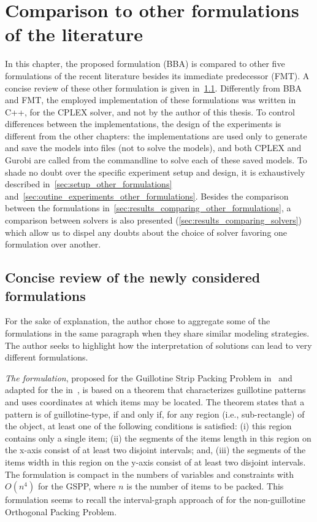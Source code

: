\chapter{Comparison to other formulations of the literature}
\label{sec:martin_chapter}

In this chapter, the proposed formulation (BBA) is compared to other five formulations of the recent literature besides its immediate predecessor (FMT).
A concise review of these other formulation is given in~\cref{sec:other_formulations}.
Differently from BBA and FMT, the employed implementation of these formulations was written in C++, for the CPLEX solver, and not by the author of this thesis.
To control differences between the implementations, the design of the experiments is different from the other chapters: the implementations are used only to generate and save the models into files (not to solve the models), and both CPLEX and Gurobi are called from the commandline to solve each of these saved models.
To shade no doubt over the specific experiment setup and design, it is exhaustively described in~\cref{sec:setup_other_formulations} and~\cref{sec:outine_experiments_other_formulations}.
Besides the comparison between the formulations in~\cref{sec:results_comparing_other_formulations}, a comparison between solvers is also presented (\cref{sec:results_comparing_solvers}) which allow us to dispel any doubts about the choice of solver favoring one formulation over another.

\section{Concise review of the newly considered formulations}
\label{sec:other_formulations}

For the sake of explanation, the author chose to aggregate some of the formulations in the same paragraph when they share similar modeling strategies.
The author seeks to highlight how the interpretation of solutions can lead to very different formulations.

\emph{The {\modelBCE} formulation}, proposed for the Guillotine Strip Packing Problem in~\citet{messaoud:2008} and adapted for the {\myproblem} in~\citet{martin:2020}, is based on a theorem that characterizes guillotine patterns and uses coordinates at which items may be located.
The theorem states that a pattern is of guillotine-type, if and only if, for any region (i.e., sub-rectangle) of the object, at least one of the following conditions is satisfied:
(i) this region contains only a single item;
(ii) the segments of the items length in this region on the x-axis consist of at least two disjoint intervals; and,
(iii) the segments of the items width in this region on the y-axis consist of at least two disjoint intervals.
The formulation is compact in the numbers of variables and constraints with \(O(n^4)\) for the GSPP, where $n$ is the number of items to be packed.
This formulation seems to recall the interval-graph approach of \citet{fekete:1997} for the non-guillotine Orthogonal Packing Problem.


